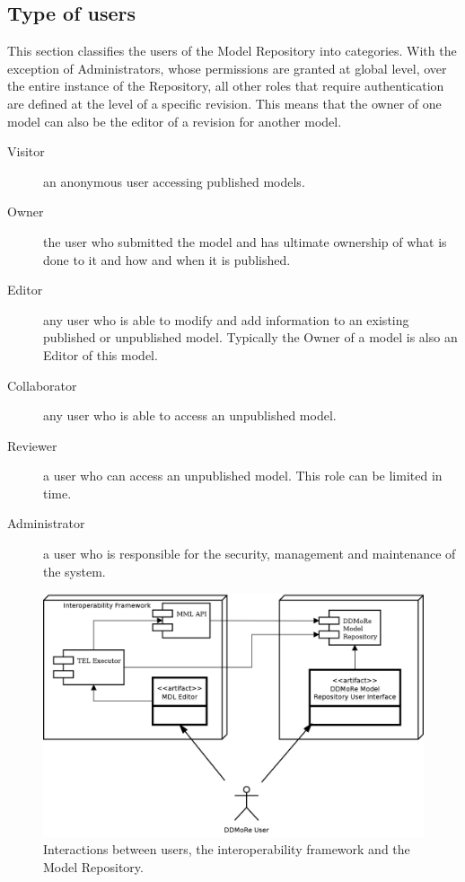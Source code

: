 \subsection{Type of users}
\label{users}
This section classifies the users of the \ddmore Model Repository into categories. With the exception of Administrators, whose permissions are granted at global level, over the entire instance of the Repository, all other roles that require authentication are defined at the level of a specific revision. This means that the owner of one model can also be the editor of a revision for another model. 

\begin{description}
  \item[Visitor] an anonymous user accessing \glspl{published model}.
  \item[Owner] the user who submitted the model and has ultimate ownership of what is done to it and how and
when it is published.
  \item[Editor] any user who is able to modify and add information to an existing published or \gls{unpublished model}. Typically the Owner of a model is also an Editor of this model.
  \item[Collaborator] any user who is able to access an unpublished model.
  \item[Reviewer] a user who can access an unpublished model. This role can be limited in time.
  \item[Administrator] a user who is responsible for the security, management and maintenance of the system.
\end{description}

\begin{figure}[htb]
\centering
\includegraphics{img/UserInteraction}
\caption{Interactions between users, the interoperability framework and the Model Repository.}
\label{fig:userInteraction}
\end{figure}
